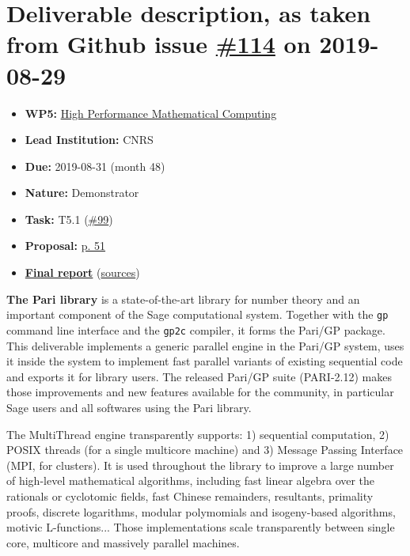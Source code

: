 \hypertarget{deliverable-description-as-taken-from-github-issue-114-on-2019-08-29}{%
\section*{\texorpdfstring{Deliverable description, as taken from Github
issue
\href{https://github.com/OpenDreamKit/OpenDreamKit/issues/114}{\#114} on
2019-08-29}{Deliverable description, as taken from Github issue \#114 on 2019-08-29}}\label{deliverable-description-as-taken-from-github-issue-114-on-2019-08-29}}

\begin{itemize}
\tightlist
\item
  \textbf{WP5:}
  \href{https://github.com/OpenDreamKit/OpenDreamKit/tree/master/WP5}{High
  Performance Mathematical Computing}
\item
  \textbf{Lead Institution:} CNRS
\item
  \textbf{Due:} 2019-08-31 (month 48)
\item
  \textbf{Nature:} Demonstrator
\item
  \textbf{Task:} T5.1
  (\href{https://github.com/OpenDreamKit/OpenDreamKit/issues/99}{\#99})
\item
  \textbf{Proposal:}
  \href{https://github.com/OpenDreamKit/OpenDreamKit/raw/master/Proposal/proposal-www.pdf}{p.
  51}
\item
  \textbf{\href{https://github.com/OpenDreamKit/OpenDreamKit/raw/master/WP5/D5.16/report-final.pdf}{Final
  report}}
  (\href{https://github.com/OpenDreamKit/OpenDreamKit/raw/master/WP5/D5.16/}{sources})
\end{itemize}

\textbf{The Pari library} is a state-of-the-art library for number
theory and an important component of the Sage computational system.
Together with the \texttt{gp} command line interface and the
\texttt{gp2c} compiler, it forms the Pari/GP package. This deliverable
implements a generic parallel engine in the Pari/GP system, uses it
inside the system to implement fast parallel variants of existing
sequential code and exports it for library users. The released Pari/GP
suite (PARI-2.12) makes those improvements and new features available
for the community, in particular Sage users and all softwares using the
Pari library.

The MultiThread engine transparently supports: 1) sequential
computation, 2) POSIX threads (for a single multicore machine) and 3)
Message Passing Interface (MPI, for clusters). It is used throughout the
library to improve a large number of high-level mathematical algorithms,
including fast linear algebra over the rationals or cyclotomic fields,
fast Chinese remainders, resultants, primality proofs, discrete
logarithms, modular polymomials and isogeny-based algorithms, motivic
L-functions... Those implementations scale transparently between single
core, multicore and massively parallel machines.
